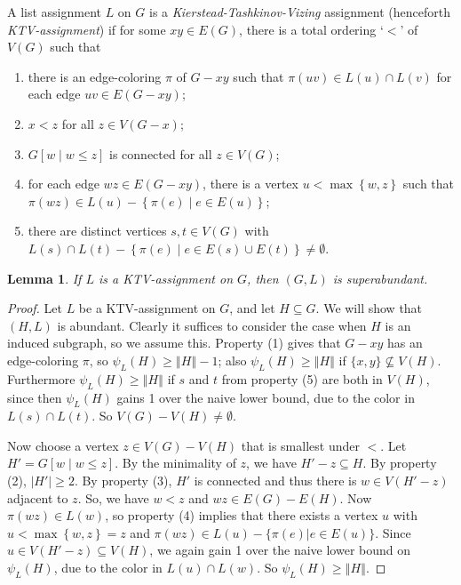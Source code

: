 \documentclass[12pt]{article}
\theoremstyle{plain}
\newtheorem{lem}[thm]{Lemma}
\theoremstyle{definition}
\theoremstyle{remark}
\newcommand{\set}[1]{\left\{ #1 \right\}}
\newcommand{\setbs}[2]{\left\{ #1 \mid #2 \right\}}
\newcommand{\card}[1]{\left|#1\right|}
\newcommand{\size}[1]{\left\Vert#1\right\Vert}
\newcommand{\brackets}[1]{\left[ #1 \right]}
\begin{document}
A list assignment $L$ on $G$ is a \emph{Kierstead-Tashkinov-Vizing} assignment (henceforth \emph{KTV-assignment}) if for some $xy \in E(G)$, there is a total ordering `$<$' of $V(G)$ such that

\begin{enumerate}
\item there is an edge-coloring $\pi$ of $G-xy$ such that $\pi(uv) \in L(u)
\cap L(v)$ for each edge $uv \in E(G - xy)$; 
\item $x < z$ for all $z \in V(G - x)$; 
\item $G\brackets{w \mid w \le z}$ is connected for all $z \in V(G)$; 
\item for each edge $wz \in E(G - xy)$, there is a vertex $u < \max\set{w, z}$ such that
$\pi(wz) \in L(u) - \setbs{\pi(e)}{e \in E(u)}$;
\item there are distinct vertices $s, t \in V(G)$ with $L(s) \cap L(t) -
\setbs{\pi(e)}{e \in E(s) \cup E(t)} \ne \emptyset$.
\end{enumerate}

\begin{lem}\label{KTVImpliesSuperabundant}
If $L$ is a KTV-assignment on $G$, then $(G, L)$ is superabundant.
\end{lem}
\begin{proof}
Let $L$ be a KTV-assignment on $G$, and let $H \subseteq G$.  We will show that
$(H,L)$ is abundant.  
Clearly it suffices to consider the case when $H$ is an induced subgraph, so we
assume this.
Property (1) gives that $G-xy$ has an edge-coloring
$\pi$, so $\psi_L(H)\ge \size{H}-1$; also $\psi_L(H)\ge \size{H}$ if
$\{x,y\}\not\subseteq V(H)$.  Furthermore $\psi_L(H)\ge \size{H}$ if $s$ and
$t$ from property (5) are both in $V(H)$, since then $\psi_L(H)$ gains 1 over
the naive lower bound, due to the color in $L(s)\cap L(t)$.  So $V(G)-
V(H)\ne \emptyset$.

Now choose a vertex $z \in V(G) - V(H)$ that is smallest under $<$.  
Let $H' = G\brackets{w \mid w \le z}$.  By the minimality of $z$, we have $H' -
z \subseteq H$. By property (2), $\card{H'} \ge 2$.  By property (3), $H'$ is
connected and thus there is $w \in V(H' - z)$ adjacent to $z$. So, we have $w <
z$ and $wz\in E(G)-E(H)$.  Now $\pi(wz)\in L(w)$,  
so property (4) implies that there exists a vertex $u$ with $u <
\max\set{w, z} = z$ and $\pi(wz) \in L(u)-\{\pi(e)|e\in E(u)\}$.  Since $u \in
V(H' - z) \subseteq V(H)$, we again gain 1 over the naive lower bound on
$\psi_L(H)$, due to the color in $L(u)\cap L(w)$.  So $\psi_L(H)\ge \size{H}$.
\end{proof}
\end{document}
